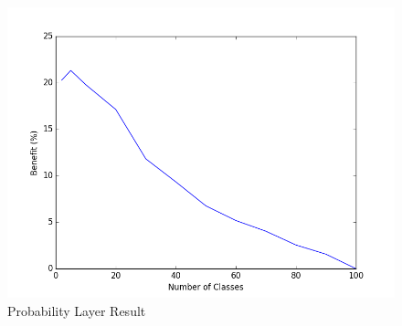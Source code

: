 \documentclass{article}
\begin{document}
\begin{figure}
\includegraphics[scale=0.43]{figure_1.png}
\caption{Probability Layer Result}
\label{fig:ProbabilityLayer}
\end{figure}
\end{document}
